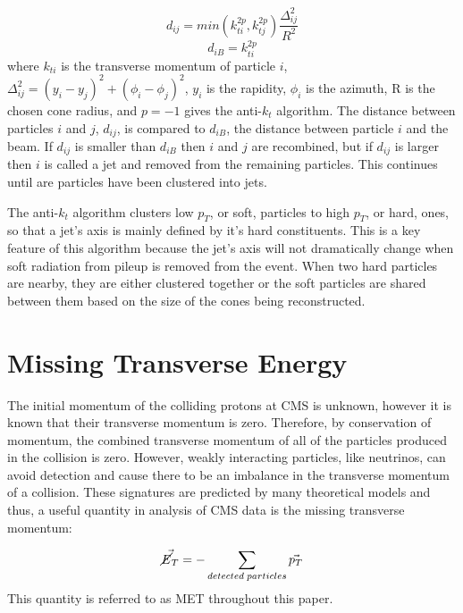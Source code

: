 \begin{equation}
d_{ij}=min(k_{ti}^{2p},k_{tj}^{2p})\frac{\Delta_{ij}^{2}}{R^{2}}
\end{equation}
\begin{equation}
d_{iB} = k_{ti}^{2p}
\end{equation}
where $k_{ti}$ is the transverse momentum of particle $i$, $\Delta_{ij}^{2} = (y_{i}-y_{j})^{2}+(\phi_{i}-\phi_{j})^{2}$, $y_{i}$ is the rapidity, $\phi_{i}$ is the azimuth, R is the chosen cone radius, and $p=-1$ gives the anti-$k_{t}$ algorithm. The distance between particles $i$ and $j$, $d_{ij}$, is compared to $d_{iB}$, the distance between particle $i$ and the beam. If $d_{ij}$ is smaller than $d_{iB}$ then $i$ and $j$ are recombined, but if $d_{ij}$ is larger then $i$ is called a jet and removed from the remaining particles. This continues until are particles have been clustered into jets.

The anti-$k_{t}$ algorithm clusters low $p_{T}$, or soft, particles to high $p_{T}$, or hard, ones, so that a jet's axis is mainly defined by it's hard constituents. This is a key feature of this algorithm because the jet's axis will not dramatically change when soft radiation from pileup is removed from the event. When two hard particles are nearby, they are either clustered together or the soft particles are shared between them based on the size of the cones being reconstructed. 

\section{Missing Transverse Energy}

The initial momentum of the colliding protons at CMS is unknown, however it is known that their transverse momentum is zero. Therefore, by conservation of momentum, the combined transverse momentum of all of the particles produced in the collision is zero. However, weakly interacting particles, like neutrinos, can avoid detection and cause there to be an imbalance in the transverse momentum of a collision. These signatures are predicted by many theoretical models and thus, a useful quantity in analysis of CMS data is the missing transverse momentum:

\begin{equation}
\vec{\cancel{E}_{T}}= -\sum_{detected\;particles} \vec{p_{T}}
\end{equation}
This quantity is referred to as MET throughout this paper.

